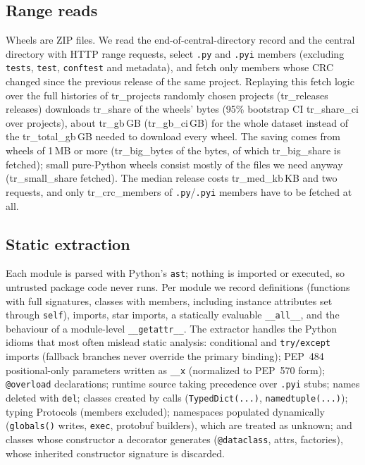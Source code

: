 \documentclass[10pt,twocolumn,letterpaper]{article}
\begin{document}
\subsection{Range reads}
Wheels are ZIP files. We read the end-of-central-directory record and the central directory with HTTP range
requests, select \texttt{.py} and \texttt{.pyi} members (excluding \texttt{tests}, \texttt{test},
\texttt{conftest} and metadata), and fetch only members whose CRC changed since the previous release of the same
project. Replaying this fetch logic over the full histories of {{tr_projects}} randomly chosen projects
({{tr_releases}} releases) downloads {{tr_share}} of the wheels' bytes (95\% bootstrap CI {{tr_share_ci}} over
projects), about {{tr_gb}}\,GB ({{tr_gb_ci}}\,GB) for the whole dataset instead of the {{tr_total_gb}}\,GB needed to
download every wheel. The saving comes from wheels of 1\,MB or more ({{tr_big_bytes}} of the bytes, of which
{{tr_big_share}} is fetched); small pure-Python wheels consist mostly of the files we need anyway ({{tr_small_share}}
fetched). The median release costs {{tr_med_kb}}\,KB and two requests, and only {{tr_crc_members}} of
\texttt{.py}/\texttt{.pyi} members have to be fetched at all.

\subsection{Static extraction}
Each module is parsed with Python's \texttt{ast}; nothing is imported or executed, so untrusted package code never
runs. Per module we record definitions (functions with full signatures, classes with members, including instance
attributes set through \texttt{self}), imports, star imports, a statically evaluable \texttt{\_\_all\_\_}, and the
behaviour of a module-level \texttt{\_\_getattr\_\_}. The extractor handles the Python idioms that most often mislead static analysis: conditional and \texttt{try/except} imports (fallback branches never
override the primary binding); PEP~484 positional-only parameters written as \texttt{\_\_x} (normalized to PEP~570
form); \texttt{@overload} declarations; runtime source taking precedence over \texttt{.pyi} stubs; names deleted with
\texttt{del}; classes created by calls (\texttt{TypedDict(...)}, \texttt{namedtuple(...)}); typing Protocols (members
excluded); namespaces populated dynamically (\texttt{globals()} writes, \texttt{exec}, protobuf builders), which are
treated as unknown; and classes whose constructor a decorator generates (\texttt{@dataclass}, attrs, factories), whose
inherited constructor signature is discarded.
\end{document}
